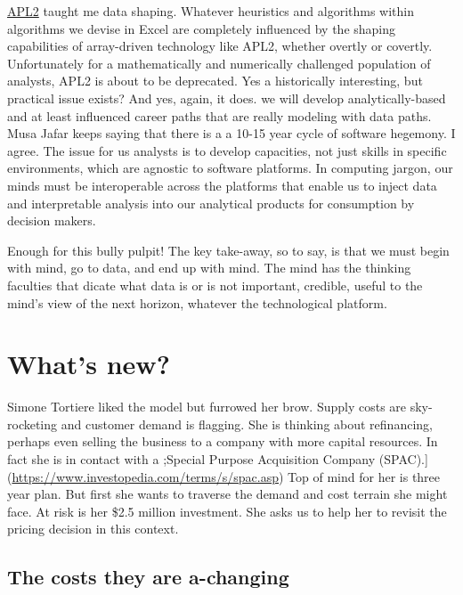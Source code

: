 \documentclass[
]{book}
\begin{document}
\href{https://www.ibm.com/products/apl2}{APL2} taught me data shaping. Whatever heuristics and algorithms within algorithms we devise in Excel are completely influenced by the shaping capabilities of array-driven technology like APL2, whether overtly or covertly. Unfortunately for a mathematically and numerically challenged population of analysts, APL2 is about to be deprecated. Yes a historically interesting, but practical issue exists? And yes, again, it does. we will develop analytically-based and at least influenced career paths that are really modeling with data paths. Musa Jafar keeps saying that there is a a 10-15 year cycle of software hegemony. I agree. The issue for us analysts is to develop capacities, not just skills in specific environments, which are agnostic to software platforms. In computing jargon, our minds must be interoperable across the platforms that enable us to inject data and interpretable analysis into our analytical products for consumption by decision makers.

Enough for this bully pulpit! The key take-away, so to say, is that we must begin with mind, go to data, and end up with mind. The mind has the thinking faculties that dicate what data is or is not important, credible, useful to the mind's view of the next horizon, whatever the technological platform.

\hypertarget{whats-new}{%
\section{What's new?}\label{whats-new}}

Simone Tortiere liked the model but furrowed her brow. Supply costs are sky-rocketing and customer demand is flagging. She is thinking about refinancing, perhaps even selling the business to a company with more capital resources. In fact she is in contact with a ;Special Purpose Acquisition Company (SPAC).{]}(\url{https://www.investopedia.com/terms/s/spac.asp}) Top of mind for her is three year plan. But first she wants to traverse the demand and cost terrain she might face. At risk is her \$2.5 million investment. She asks us to help her to revisit the pricing decision in this context.

\hypertarget{the-costs-they-are-a-changing}{%
\subsection{The costs they are a-changing}\label{the-costs-they-are-a-changing}}
\end{document}
